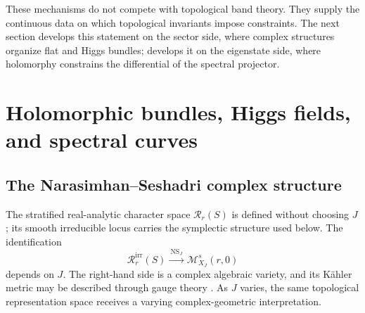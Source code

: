 \documentclass[11pt]{article}
\theoremstyle{definition}
\theoremstyle{remark}
\newcommand{\cR}{\mathcal R}
\newcommand{\cM}{\mathcal M}
\begin{document}
These mechanisms do not compete with topological band theory.  They supply
the continuous data on which topological invariants impose constraints.  The
next section develops this statement on the sector side, where complex
structures organize flat and Higgs bundles; 
develops it on the eigenstate side, where holomorphy constrains the
differential of the spectral projector.

\section{Holomorphic bundles, Higgs fields, and spectral curves}
\label{sec:holomorphy}

\subsection{The Narasimhan--Seshadri complex structure}

The stratified real-analytic character space \(\cR_r(S)\) is defined without
choosing \(J\); its smooth irreducible locus carries the symplectic structure
used below.
The identification
\[
        \cR_r^{\mathrm{irr}}(S)
           \xrightarrow{\ \mathrm{NS}_J\ }
        \cM_{X_J}^s(r,0)
        \tag{6.1}\label{eq:NS-J}
\]
depends on \(J\).  The right-hand side is a complex algebraic variety, and
its K\"ahler metric may be described through gauge theory
\cite{NarasimhanSeshadri,DonaldsonNS,AtiyahBott,GarciaRabosoRayan}.  As \(J\)
varies, the same topological representation space receives a varying
complex-geometric interpretation.
\end{document}
